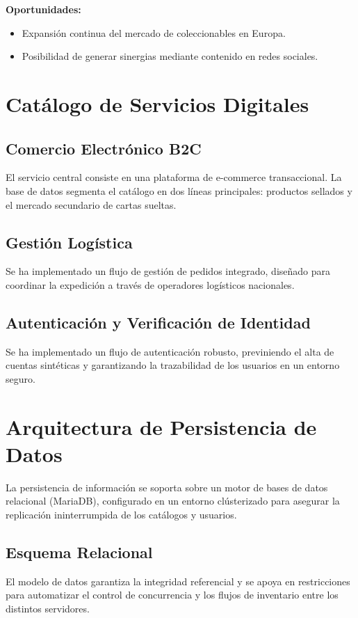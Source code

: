 \documentclass[12pt,a4paper]{article}
\begin{document}
\textbf{Oportunidades:}
\begin{itemize}
    \item Expansión continua del mercado de coleccionables en Europa.
    \item Posibilidad de generar sinergias mediante contenido en redes sociales.
\end{itemize}

\newpage
\section{Catálogo de Servicios Digitales}
\label{Servicios}

\subsection{Comercio Electrónico B2C}
El servicio central consiste en una plataforma de e-commerce transaccional. La base de datos segmenta el catálogo en dos líneas principales: productos sellados y el mercado secundario de cartas sueltas.

\subsection{Gestión Logística}
Se ha implementado un flujo de gestión de pedidos integrado, diseñado para coordinar la expedición a través de operadores logísticos nacionales.

\subsection{Autenticación y Verificación de Identidad}
Se ha implementado un flujo de autenticación robusto, previniendo el alta de cuentas sintéticas y garantizando la trazabilidad de los usuarios en un entorno seguro.

\newpage
\section{Arquitectura de Persistencia de Datos}
La persistencia de información se soporta sobre un motor de bases de datos relacional (MariaDB), configurado en un entorno clústerizado para asegurar la replicación ininterrumpida de los catálogos y usuarios.

\subsection{Esquema Relacional}
El modelo de datos garantiza la integridad referencial y se apoya en restricciones para automatizar el control de concurrencia y los flujos de inventario entre los distintos servidores.
\end{document}
